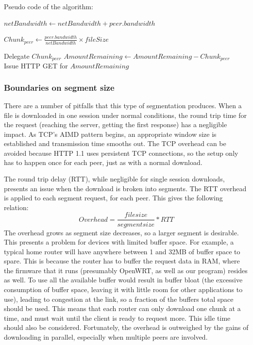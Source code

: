 \documentclass[12pt]{article}
\begin{document}
			Pseudo code of the algorithm:

			\begin{algorithmic}
					\State $netBandwidth\gets netBandwidth + peer.bandwidth$
				\EndFor

					\State $Chunk_{peer} \gets \frac{peer.bandwidth}{netBandwidth} \times{fileSize}$
				\EndFor

					Delegate $Chunk_{peer}$
					\State $AmountRemaining \gets AmountRemaining - Chunk_{peer}$
				\EndFor\\
				Issue HTTP GET for $AmountRemaining$
			\end{algorithmic}

		\subsubsection{Boundaries on segment size}

			There are a number of pitfalls that this type of segmentation produces. When a file is downloaded in one session under normal conditions, the round trip time for the request (reaching the server, getting the first response) has a negligible impact. As TCP's AIMD pattern begins, an appropriate window size is established and transmission time smooths out. The TCP overhead can be avoided because HTTP 1.1 uses persistent TCP connections, so the setup only has to happen once for each peer, just as with a normal download.

			The round trip delay (RTT), while negligible for single session downloads, presents an issue when the download is broken into segments. The RTT overhead is applied to each segment request, for each peer. This gives the following relation:
			$$Overhead = \frac{file size}{segment size} * RTT$$
			The overhead grows as segment size decreases, so a larger segment is desirable. This presents a problem for devices with limited buffer space. For example, a typical home router will have anywhere between 1 and 32MB of buffer space to spare. This is because the router has to buffer the request data in RAM, where the firmware that it runs (presumably OpenWRT, as well as our program) resides as well. To use all the available buffer would result in buffer bloat (the excessive consumption of buffer space, leaving it with little room for other applications to use), leading to congestion at the link, so a fraction of the buffers total space should be used. This means that each router can only download one chunk at a time, and must wait until the client is ready to request more. This idle time should also be considered. Fortunately, the overhead is outweighed by the gains of downloading in parallel, especially when multiple peers are involved.
\end{document}
